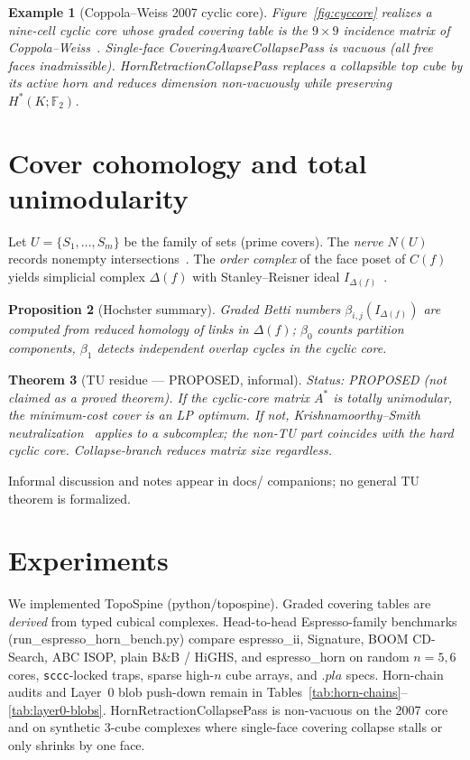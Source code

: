 \documentclass[11pt]{article}
\newtheorem{theorem}{Theorem}
\newtheorem{proposition}[theorem]{Proposition}
\newtheorem{example}[theorem]{Example}
\begin{document}
\begin{example}[Coppola--Weiss 2007 cyclic core]
\label{ex:cyccore}
Figure~\ref{fig:cyccore} realizes a nine-cell cyclic core whose graded covering
table is the $9\times 9$ incidence matrix of Coppola--Weiss~\cite{coppola2007}.
Single-face \textsf{CoveringAwareCollapsePass} is vacuous (all free faces
inadmissible).  \textsf{HornRetractionCollapsePass} replaces a collapsible top
cube by its active horn and reduces dimension non-vacuously while preserving
$H^*(K;\mathbb{F}_2)$.
\end{example}

\section{Cover cohomology and total unimodularity}
\label{sec:cohom}

Let $U=\{S_1,\ldots,S_m\}$ be the family of sets (prime covers).  The
\emph{nerve} $N(U)$ records nonempty intersections~\cite{bjorner2003}.  The
\emph{order complex} of the face poset of $C(f)$ yields simplicial complex
$\Delta(f)$ with Stanley--Reisner ideal $I_{\Delta(f)}$~\cite{francisco2013,psrt2025}.

\begin{proposition}[Hochster summary]
Graded Betti numbers $\beta_{i,j}(I_{\Delta(f)})$ are computed from reduced
homology of links in $\Delta(f)$; $\beta_0$ counts partition components,
$\beta_1$ detects independent overlap cycles in the cyclic core.
\end{proposition}

\begin{theorem}[TU residue --- PROPOSED, informal]
\label{thm:tu}
\textit{Status:} PROPOSED (not claimed as a proved theorem).
If the cyclic-core matrix $A^*$ is totally unimodular, the minimum-cost cover
is an LP optimum.  If not, Krishnamoorthy--Smith neutralization~\cite{ks2018}
applies to a subcomplex; the non-TU part coincides with the hard cyclic core.
Collapse-branch reduces matrix size regardless.
\end{theorem}

\noindent Informal discussion and notes appear in
\textsf{docs/} companions; no general TU theorem is formalized.

\section{Experiments}
\label{sec:experiments}

We implemented \textsf{TopoSpine} (\textsf{python/topospine}).  Graded covering
tables are \emph{derived} from typed cubical complexes.  Head-to-head
Espresso-family benchmarks (\textsf{run\_espresso\_horn\_bench.py}) compare
\textsf{espresso\_ii}, Signature, BOOM CD-Search, ABC ISOP, plain B\&B / HiGHS,
and \textsf{espresso\_horn} on random $n=5,6$ cores, \texttt{sccc}-locked traps,
sparse high-$n$ cube arrays, and $.pla$ specs.  Horn-chain audits and Layer~0
blob push-down remain in Tables~\ref{tab:horn-chains}--\ref{tab:layer0-blobs}.
\textsf{HornRetractionCollapsePass} is non-vacuous on the 2007 core and on
synthetic 3-cube complexes where single-face covering collapse stalls or only
shrinks by one face.
\end{document}

